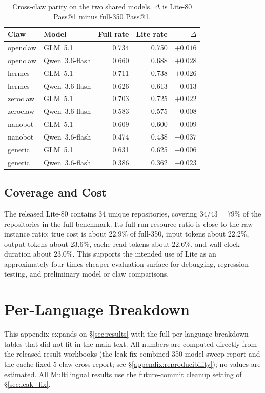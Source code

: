 \documentclass{llmxive}
\begin{document}
\begin{table}[!htbp]
\centering
\small
\begin{tabular}{llrrr}
\toprule
Claw & Model & Full rate & Lite rate & $\Delta$ \\
\midrule
openclaw & GLM~5.1 & 0.734 & 0.750 & $+0.016$ \\
openclaw & Qwen~3.6-flash & 0.660 & 0.688 & $+0.028$ \\
hermes & GLM~5.1 & 0.711 & 0.738 & $+0.026$ \\
hermes & Qwen~3.6-flash & 0.626 & 0.613 & $-0.013$ \\
zeroclaw & GLM~5.1 & 0.703 & 0.725 & $+0.022$ \\
zeroclaw & Qwen~3.6-flash & 0.583 & 0.575 & $-0.008$ \\
nanobot & GLM~5.1 & 0.609 & 0.600 & $-0.009$ \\
nanobot & Qwen~3.6-flash & 0.474 & 0.438 & $-0.037$ \\
generic & GLM~5.1 & 0.631 & 0.625 & $-0.006$ \\
generic & Qwen~3.6-flash & 0.386 & 0.362 & $-0.023$ \\
\bottomrule
\end{tabular}
\caption{Cross-claw parity on the two shared models.  $\Delta$ is
Lite-80 Pass@1 minus full-350 Pass@1.}
\label{tab:lite-crossclaw}
\end{table}

\subsection{Coverage and Cost}

The released Lite-80 contains 34 unique repositories, covering
$34/43=79\%$ of the repositories in the full benchmark.  Its full-run
resource ratio is close to the raw instance ratio: true cost is about
$22.9\%$ of full-350, input tokens about $22.2\%$, output tokens about
$23.6\%$, cache-read tokens about $22.6\%$, and wall-clock duration
about $23.0\%$.  This supports the intended use of Lite as an
approximately four-times cheaper evaluation surface for debugging,
regression testing, and preliminary model or claw comparisons.

\section{Per-Language Breakdown}\label{appendix:per-repo}

This appendix expands on \S\ref{sec:results} with the full per-language breakdown
tables that did not fit in the main text. All numbers are computed directly from
the released result workbooks (the leak-fix combined-350 model-sweep report and
the cache-fixed 5-claw cross report; see \S\ref{appendix:reproducibility}); no
values are estimated. All Multilingual results use the future-commit cleanup
setting of \S\ref{sec:leak_fix}.
\end{document}
